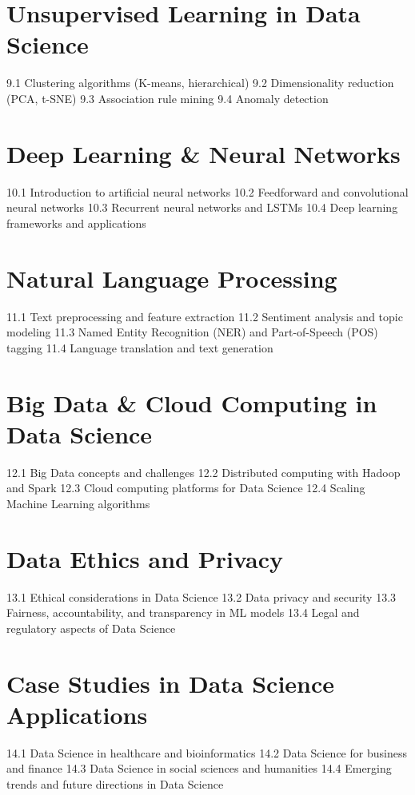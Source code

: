 \section{Unsupervised Learning in Data Science}
9.1 Clustering algorithms (K-means, hierarchical)
9.2 Dimensionality reduction (PCA, t-SNE)
9.3 Association rule mining
9.4 Anomaly detection
\section{Deep Learning \& Neural Networks}
10.1 Introduction to artificial neural networks
10.2 Feedforward and convolutional neural networks
10.3 Recurrent neural networks and LSTMs
10.4 Deep learning frameworks and applications
\section{Natural Language Processing}
11.1 Text preprocessing and feature extraction
11.2 Sentiment analysis and topic modeling
11.3 Named Entity Recognition (NER) and Part-of-Speech (POS) tagging
11.4 Language translation and text generation
\section{Big Data \& Cloud Computing in Data Science}
12.1 Big Data concepts and challenges
12.2 Distributed computing with Hadoop and Spark
12.3 Cloud computing platforms for Data Science
12.4 Scaling Machine Learning algorithms
\section{Data Ethics and Privacy}
13.1 Ethical considerations in Data Science
13.2 Data privacy and security
13.3 Fairness, accountability, and transparency in ML models
13.4 Legal and regulatory aspects of Data Science
\section{Case Studies in Data Science Applications}
14.1 Data Science in healthcare and bioinformatics
14.2 Data Science for business and finance
14.3 Data Science in social sciences and humanities
14.4 Emerging trends and future directions in Data Science
